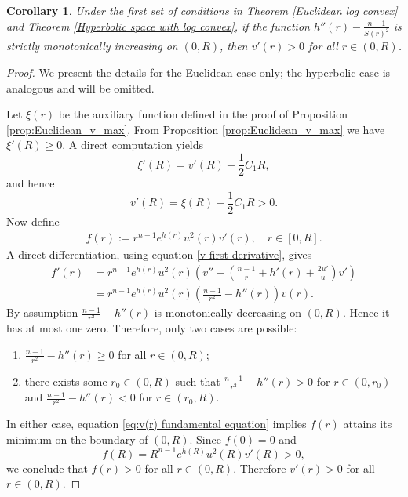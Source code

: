 \documentclass[11pt,leqno]{amsart}
\newtheorem{corollary}[theorem]{Corollary}
\numberwithin{equation}{section}
\begin{document}
\begin{corollary}\label{Monotonicity of v}
Under the first set of conditions in Theorem \ref{Euclidean log convex} and Theorem \ref{Hyperbolic space with log convex}, if the function 
$h''(r)-\frac{n-1}{S(r)^{2}}$ is strictly monotonically increasing on \((0,R)\), then \(v'(r)>0\) for all \(r\in (0,R)\).
\end{corollary}

\begin{proof}
We present the details for the Euclidean case only; the hyperbolic case is analogous and will be omitted.

 Let $\xi(r)$ be the auxiliary function defined in the proof of Proposition \ref{prop:Euclidean_v_max}. From Proposition  \ref{prop:Euclidean_v_max} we have  
 $\xi'(R)\ge 0$.
A direct computation yields
 $$
 \xi'(R)=v'(R)-\frac 1 2 C_{1}R,
 $$
and hence $$v'(R)=\xi(R)+\frac 1 2 C_1 R>0.$$
Now define 
\begin{align*}
f(r):=r^{n-1}e^{h(r)}u^{2}(r)v'(r),\quad r\in [0,R].
\end{align*}
A direct differentiation, using equation \eqref{v first derivative}, gives 
\begin{align}\label{eq:v(r) fundamental equation}
f'(r)
&=r^{n-1}e^{h(r)}u^{2}(r)\left(v''+\left(\frac{n-1}{r}+h'(r)+\frac{2u'}{u}\right)v'\right)\nonumber\\
&=r^{n-1}e^{h(r)}u^{2}(r)\left(\frac{n-1}{r^2}-h''(r)\right)v(r).
\end{align}
By assumption \(\frac{n-1}{r^2}-h''(r)\) is monotonically decreasing on \((0,R)\). Hence it has at most one zero. Therefore, only two cases are possible:
\begin{enumerate}
\item \(\frac{n-1}{r^2}-h''(r)\geq 0\) for all \(r\in (0,R)\);
\item there exists some \(r_0\in(0,R)\) such that \(\frac{n-1}{{r^2}}-h''(r)>0\) for \(r\in(0,r_0)\) and \(\frac{n-1}{{r^2}}-h''(r)<0\) for \(r\in(r_0,R)\).
\end{enumerate}
In either case, equation \eqref{eq:v(r) fundamental equation} implies $f(r)$  attains  its minimum on the boundary of  $(0,R)$.  Since $f(0)=0$ and $$f(R)=R^{n-1}e^{h(R)}u^{2}(R)v'(R)>0,$$ we conclude that  \(f(r)>0\) for all \(r\in(0,R)\). 
Therefore $v'(r)>0$ for all \(r\in(0,R)\).





\end{proof}
\end{document}

